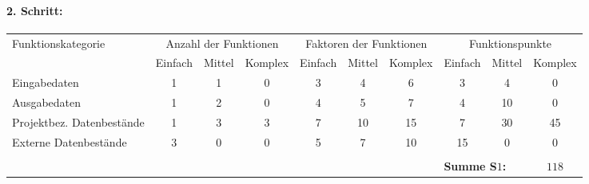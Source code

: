 \begin{landscape}
	\paragraph{2. Schritt:}
	\begin{flushleft}
		\begin{tabular}{|l|ccc|ccc|ccc|}
			\hline
			\multirow{2}{*}{Funktionskategorie} & \multicolumn{3}{c|}{Anzahl der Funktionen} & \multicolumn{3}{c|}{Faktoren der Funktionen} & \multicolumn{3}{c|}{Funktionspunkte}\\
			& Einfach & Mittel & Komplex & Einfach & Mittel & Komplex & Einfach & Mittel & Komplex\\
			\hline
			Eingabedaten & 1 & 1 & 0 & 3 & 4 & 6 & 3 & 4 & 0\\
			Ausgabedaten & 1 & 2 & 0 & 4 & 5 & 7 & 4 & 10 & 0\\
			Projektbez. Datenbestände & 1 & 3 & 3 & 7 & 10 & 15 & 7 & 30 & 45\\
			Externe Datenbestände & 3 & 0 & 0 & 5 & 7 & 10 & 15 & 0 & 0\\
			\hline
			\multicolumn{10}{c}{}\\
			\cline{8-10}
			\multicolumn{7}{c}{} & \multicolumn{2}{|l|}{{\bf Summe S$1$:}} & {\bf $118$}\\
			\cline{8-10}			
		\end{tabular}
	\end{flushleft}
	\vspace{0.2cm}
	\begin{minipage}{0.7\textwidth}

\end{minipage}
\end{landscape}
